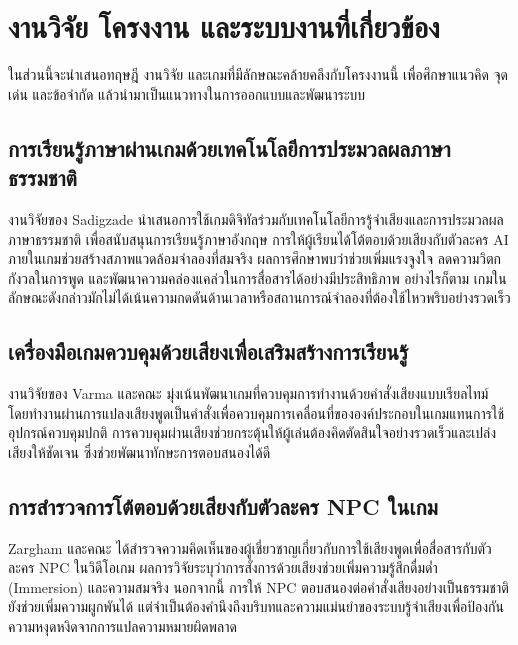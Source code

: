 
\section{งานวิจัย โครงงาน และระบบงานที่เกี่ยวข้อง}

ในส่วนนี้จะนำเสนอทฤษฎี งานวิจัย และเกมที่มีลักษณะคล้ายคลึงกับโครงงานนี้ เพื่อศึกษาแนวคิด จุดเด่น และข้อจำกัด แล้วนำมาเป็นแนวทางในการออกแบบและพัฒนาระบบ

\subsection{การเรียนรู้ภาษาผ่านเกมด้วยเทคโนโลยีการประมวลผลภาษาธรรมชาติ}

งานวิจัยของ Sadigzade\cite{sadigzade2025} นำเสนอการใช้เกมดิจิทัลร่วมกับเทคโนโลยีการรู้จำเสียงและการประมวลผลภาษาธรรมชาติ เพื่อสนับสนุนการเรียนรู้ภาษาอังกฤษ การให้ผู้เรียนได้โต้ตอบด้วยเสียงกับตัวละคร AI ภายในเกมช่วยสร้างสภาพแวดล้อมจำลองที่สมจริง ผลการศึกษาพบว่าช่วยเพิ่มแรงจูงใจ ลดความวิตกกังวลในการพูด และพัฒนาความคล่องแคล่วในการสื่อสารได้อย่างมีประสิทธิภาพ อย่างไรก็ตาม เกมในลักษณะดังกล่าวมักไม่ได้เน้นความกดดันด้านเวลาหรือสถานการณ์จำลองที่ต้องใช้ไหวพริบอย่างรวดเร็ว

\subsection{เครื่องมือเกมควบคุมด้วยเสียงเพื่อเสริมสร้างการเรียนรู้}

งานวิจัยของ Varma และคณะ\cite{varma2025} มุ่งเน้นพัฒนาเกมที่ควบคุมการทำงานด้วยคำสั่งเสียงแบบเรียลไทม์ โดยทำงานผ่านการแปลงเสียงพูดเป็นคำสั่งเพื่อควบคุมการเคลื่อนที่ขององค์ประกอบในเกมแทนการใช้อุปกรณ์ควบคุมปกติ การควบคุมผ่านเสียงช่วยกระตุ้นให้ผู้เล่นต้องคิดตัดสินใจอย่างรวดเร็วและเปล่งเสียงให้ชัดเจน ซึ่งช่วยพัฒนาทักษะการตอบสนองได้ดี

\subsection{การสำรวจการโต้ตอบด้วยเสียงกับตัวละคร NPC ในเกม}

Zargham และคณะ\cite{zargham2024} ได้สำรวจความคิดเห็นของผู้เชี่ยวชาญเกี่ยวกับการใช้เสียงพูดเพื่อสื่อสารกับตัวละคร NPC ในวิดีโอเกม ผลการวิจัยระบุว่าการสั่งการด้วยเสียงช่วยเพิ่มความรู้สึกดื่มด่ำ (Immersion) และความสมจริง นอกจากนี้ การให้ NPC ตอบสนองต่อคำสั่งเสียงอย่างเป็นธรรมชาติยังช่วยเพิ่มความผูกพันได้ แต่จำเป็นต้องคำนึงถึงบริบทและความแม่นยำของระบบรู้จำเสียงเพื่อป้องกันความหงุดหงิดจากการแปลความหมายผิดพลาด

